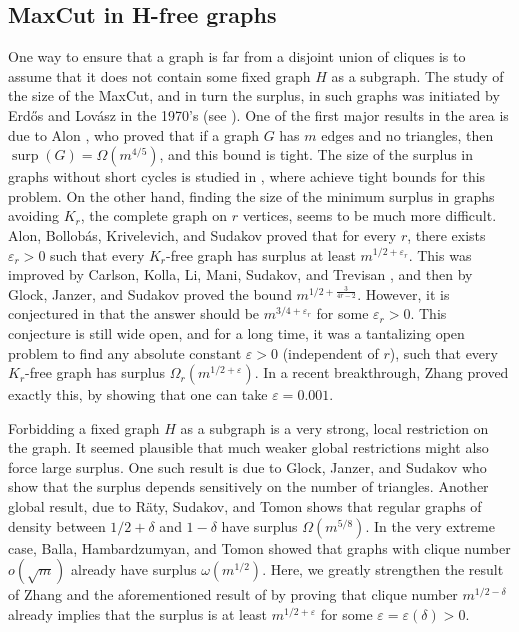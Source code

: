 \documentclass[11pt]{article}
\theoremstyle{plain}
\theoremstyle{definition}
\DeclareMathOperator{\surp}{surp}
\newcommand{\eps}{\varepsilon}
\begin{document}
\subsection{MaxCut in H-free graphs}

One way to ensure that a graph is far from a disjoint union of cliques is to assume that it does not contain some fixed graph $H$ as a subgraph. The study of the size of the MaxCut, and in turn the surplus, in such graphs was initiated by Erd\H{o}s and Lov\'asz in the 1970's (see \cite{erdos}). One of the first major results in the area is due to Alon \cite{AlonMaxCut}, who proved that if a graph $G$ has $m$ edges and no triangles, then $\surp(G)=\Omega(m^{4/5})$, and this bound is tight. The size of the surplus in graphs without short cycles is studied in \cite{ABKS,AKS05,BJS,GJS}, where \cite{BJS,GJS} achieve tight bounds for this problem. 
On the other hand, finding the size of the minimum surplus in graphs avoiding $K_r$, the complete graph on $r$ vertices, seems to be much more difficult. Alon, Bollob\'as, Krivelevich, and Sudakov \cite{AKS05} proved that for every $r$, there exists $\eps_r>0$ such that every $K_r$-free graph has surplus at least $m^{1/2+\eps_r}$. This was improved by Carlson, Kolla, Li, Mani, Sudakov, and Trevisan \cite{CKLMST}, and then by Glock, Janzer, and Sudakov \cite{GJS} proved the bound $m^{1/2+\frac{3}{4r-2}}$. However, it is conjectured in \cite{ABKS} that the answer should be $m^{3/4+\eps_r}$ for some $\eps_r>0$. This conjecture is still wide open, and for a long time, it was a tantalizing open problem to find any absolute constant $\eps>0$ (independent of $r$), such that every $K_r$-free graph has surplus $\Omega_r(m^{1/2+\eps})$. In a recent breakthrough, Zhang \cite{Zhang} proved exactly this, by showing that one can take $\eps=0.001$.

Forbidding a fixed graph $H$ as a subgraph is a very strong, local restriction on the graph. It seemed plausible that much weaker global restrictions might also force large surplus. One such result is due to Glock, Janzer, and Sudakov \cite{GJS} who show that the surplus depends sensitively on the number of triangles. Another global result, due to R\"aty, Sudakov, and Tomon \cite{RST} shows that regular graphs of density between $1/2+\delta$ and $1-\delta$ have surplus $\Omega(m^{5/8})$. In the very extreme case, Balla, Hambardzumyan, and Tomon \cite{BHT} showed that graphs with clique number $o(\sqrt{m})$ already have surplus $\omega(m^{1/2})$. Here, we greatly strengthen the result of Zhang \cite{Zhang} and the aforementioned result of \cite{BHT} by proving that clique number $m^{1/2-\delta}$ already implies that the surplus is at least $m^{1/2+\eps}$ for some $\eps=\eps(\delta)>0$.
\end{document}
